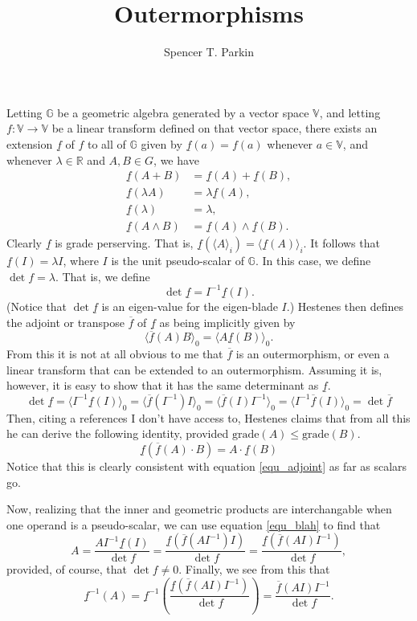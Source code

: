 \documentclass[12pt]{article}
\title{Outermorphisms}
\author{Spencer T. Parkin}
\newcommand{\G}{\mathbb{G}}
\newcommand{\V}{\mathbb{V}}
\newcommand{\R}{\mathbb{R}}
\newcommand{\uf}{\underline{f}}
\newcommand{\of}{\overline{f}}
\newcommand{\grade}{\mbox{grade}}
\begin{document}
\maketitle

Letting $\G$ be a geometric algebra generated by a vector space $\V$,
and letting $f:\V\to\V$ be a linear transform defined on that vector space, there exists an extension $\uf$ of $f$ to
all of $\G$ given by $\uf(a)=f(a)$ whenever $a\in \V$, and whenever $\lambda\in\R$ and $A,B\in G$, we have
\begin{align}
\uf(A+B) &= \uf(A) + \uf(B), \\
\uf(\lambda A) &= \lambda\uf(A), \\
\uf(\lambda) &= \lambda, \\
\uf(A\wedge B) &= \uf(A)\wedge\uf(B).
\end{align}
Clearly $\uf$ is grade perserving.  That is, $\uf(\langle A\rangle_i)=\langle\uf(A)\rangle_i$.
It follows that $\uf(I)=\lambda I$, where $I$ is the unit pseudo-scalar of $\G$.
In this case, we define $\det f=\lambda$.  That is, we define
\begin{equation}
\det\uf = I^{-1}\uf(I).
\end{equation}
(Notice that $\det\uf$ is an eigen-value for the eigen-blade $I$.)
Hestenes then defines the adjoint or transpose $\of$ of $\uf$ as being implicitly given by
\begin{equation}
\langle\of(A)B\rangle_0 = \langle A\uf(B)\rangle_0.\label{equ_adjoint}
\end{equation}
From this it is not at all obvious to me that $\of$ is an outermorphism, or even a linear transform
that can be extended to an outermorphism.  Assuming it is, however, it is easy to show that it
has the same determinant as $\uf$.
\begin{equation}
\det\uf=\langle I^{-1}\uf(I)\rangle_0=\langle\of(I^{-1})I\rangle_0=\langle\of(I)I^{-1}\rangle_0=\langle I^{-1}\of(I)\rangle_0=\det\of
\end{equation}
Then, citing a references I don't have access to, Hestenes claims that from all this he can derive the following identity, provided $\grade(A)\leq\grade(B)$.
\begin{equation}
\uf(\of(A)\cdot B)=A\cdot\uf(B)\label{equ_blah}
\end{equation}
Notice that this is clearly consistent with equation \eqref{equ_adjoint} as far as scalars go.

Now, realizing that the inner and geometric products are interchangable when one operand is a pseudo-scalar,
we can use equation \eqref{equ_blah} to find that
\begin{equation}
A = \frac{AI^{-1}\uf(I)}{\det f} = \frac{\uf(\of(AI^{-1})I)}{\det f} = \frac{\uf(\of(AI)I^{-1})}{\det f},
\end{equation}
provided, of course, that $\det f\neq 0$.  Finally, we see from this that
\begin{equation}
\uf^{-1}(A) = \uf^{-1}\left(\frac{\uf(\of(AI)I^{-1})}{\det f}\right) = \frac{\of(AI)I^{-1}}{\det f}.\label{equ_inv}
\end{equation}
\end{document}
